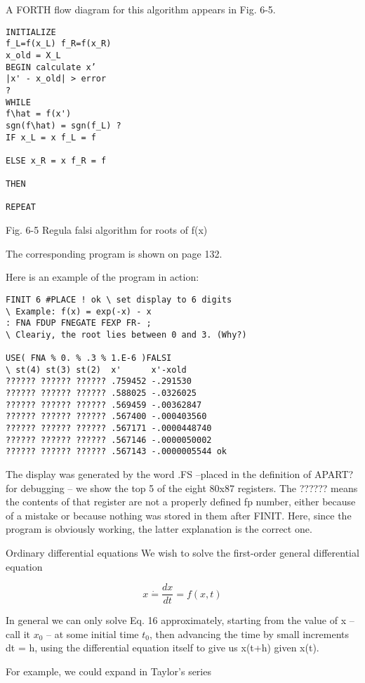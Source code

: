 A FORTH flow diagram for this algorithm appears in Fig. 6-5.

\begin{lstlisting}
INITIALIZE
f_L=f(x_L) f_R=f(x_R)
x_old = X_L
BEGIN calculate x’
|x' - x_old| > error
?
WHILE
f\hat = f(x')
sgn(f\hat) = sgn(f_L) ?
IF x_L = x f_L = f

ELSE x_R = x f_R = f

THEN

REPEAT
\end{lstlisting}

Fig. 6-5 Regula falsi algorithm for roots of f(x)

The corresponding program is shown on page 132.

Here is an example of the program in action:

\begin{lstlisting}
FINIT 6 #PLACE ! ok \ set display to 6 digits
\ Example: f(x) = exp(-x) - x
: FNA FDUP FNEGATE FEXP FR- ;
\ Cleariy, the root lies between 0 and 3. (Why?)

USE( FNA % 0. % .3 % 1.E-6 )FALSI
\ st(4) st(3) st(2)  x'      x'-xold
?????? ?????? ?????? .759452 -.291530
?????? ?????? ?????? .588025 -.0326025
?????? ?????? ?????? .569459 -.00362847
?????? ?????? ?????? .567400 -.000403560
?????? ?????? ?????? .567171 -.0000448740
?????? ?????? ?????? .567146 -.0000050002
?????? ?????? ?????? .567143 -.0000005544 ok
\end{lstlisting}

The display was generated by the word .FS --placed in the
definition of APART? for debugging -- we show the top 5 of the eight 80x87 registers. The ?????? means the contents of that register are not a properly defined fp number, either because of a mistake or because nothing was stored in them after FINIT. Here, since the program is obviously working, the latter explanation is the correct one.

Ordinary differential equations
We wish to solve the first-order general differential equation

\begin{equation}
x\dot = \frac{dx}{dt} = f(x,t)
\end{equation}

In general we can only solve Eq. 16 approximately, starting from the value of x -- call it $x_0$ -- at some initial time $t_0$, then advancing the time by small increments dt = h, using the differential equation itself to give us x(t+h) given x(t).

For example, we could expand in Taylor’s series

